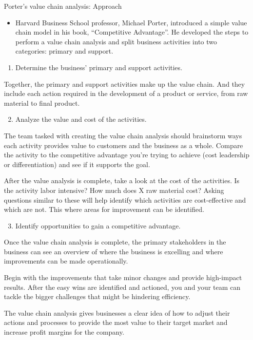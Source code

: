 \documentclass[12pt,ignorenonframetext,aspectratio=169]{beamer}
\providecommand{\tightlist}{%
  \setlength{\itemsep}{0pt}\setlength{\parskip}{0pt}}
\begin{document}
\begin{frame}{Porter's value chain analysis: Approach}
\begin{itemize}
\tightlist
\item
  Harvard Business School professor, Michael Porter, introduced a simple
  value chain model in his book, ``Competitive Advantage''. He developed
  the steps to perform a value chain analysis and split business
  activities into two categories: primary and support.
\end{itemize}

\begin{enumerate}
\tightlist
\item
  Determine the business' primary and support activities.
\end{enumerate}

Together, the primary and support activities make up the value chain.
And they include each action required in the development of a product or
service, from raw material to final product.
\end{frame}

\begin{frame}{}
\protect\hypertarget{section}{}
\begin{enumerate}
\setcounter{enumi}{1}
\tightlist
\item
  Analyze the value and cost of the activities.
\end{enumerate}

The team tasked with creating the value chain analysis should brainstorm
ways each activity provides value to customers and the business as a
whole. Compare the activity to the competitive advantage you're trying
to achieve (cost leadership or differentiation) and see if it supports
the goal.

After the value analysis is complete, take a look at the cost of the
activities. Is the activity labor intensive? How much does X raw
material cost? Asking questions similar to these will help identify
which activities are cost-effective and which are not. This where areas
for improvement can be identified.
\end{frame}

\begin{frame}{}
\protect\hypertarget{section-1}{}
\begin{enumerate}
\setcounter{enumi}{2}
\tightlist
\item
  Identify opportunities to gain a competitive advantage.
\end{enumerate}

Once the value chain analysis is complete, the primary stakeholders in
the business can see an overview of where the business is excelling and
where improvements can be made operationally.

Begin with the improvements that take minor changes and provide
high-impact results. After the easy wins are identified and actioned,
you and your team can tackle the bigger challenges that might be
hindering efficiency.

The value chain analysis gives businesses a clear idea of how to adjust
their actions and processes to provide the most value to their target
market and increase profit margins for the company.
\end{frame}
\end{document}
